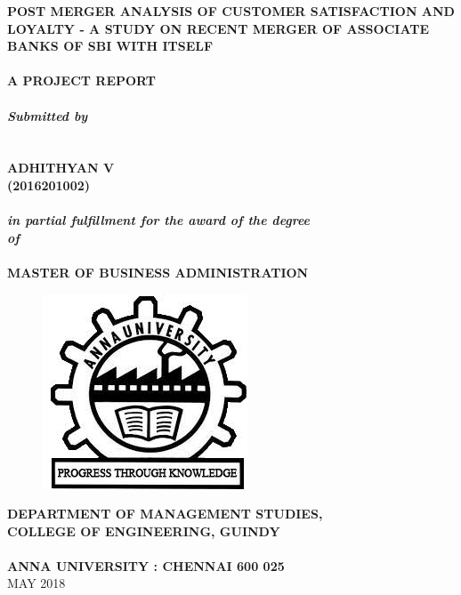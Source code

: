 \documentclass[a4paper, 14pt]{extarticle}
\newcommand\tab[1][1cm]{\hspace*{#1}}
\begin{document}
{
\selectfont
\begin{center}	
\textbf{\fontsize{18}{2} \selectfont POST MERGER ANALYSIS OF CUSTOMER SATISFACTION AND LOYALTY - A STUDY ON RECENT MERGER OF ASSOCIATE BANKS OF SBI WITH ITSELF}\\
\tab \\
\textbf{\fontsize{14}{2} \selectfont A PROJECT REPORT}\\
\tab \\
\textbf{\fontsize{14}{2} \selectfont \emph{Submitted by}}\\
\tab \\
\tab \\
{\fontsize{16}{2} \selectfont
\textbf{ADHITHYAN V}}\\
{\fontsize{16}{2} \selectfont \textbf{(2016201002)}}\\
\tab \\
\textbf{\emph{\fontsize{14}{2} \selectfont in partial fulfillment for the award of the degree\\ of}}\\
\tab \\
\textbf{\fontsize{16}{2} \selectfont MASTER OF BUSINESS ADMINISTRATION}\\
\begin{figure}[H]
\centering
\includegraphics[scale=0.5]{anna_univ_logo.jpg}
\end{figure}
\textbf{\fontsize{14}{2} \selectfont DEPARTMENT OF MANAGEMENT STUDIES, \\COLLEGE OF ENGINEERING, GUINDY}\\
\tab \\
\textbf{\fontsize{16}{2} \selectfont ANNA UNIVERSITY : CHENNAI 600 025}\\
{\fontsize{14}{2} \selectfont MAY 2018}\\
\end{center}
	
}
\end{document}
